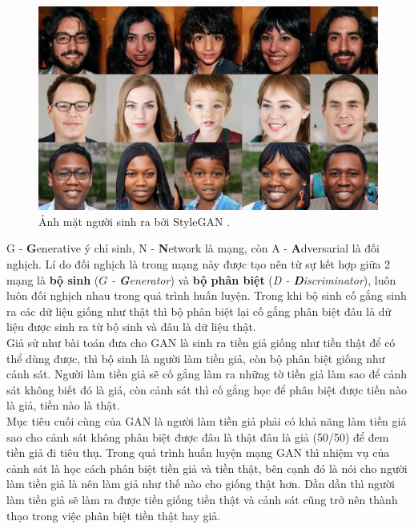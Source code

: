 \documentclass[a4paper, 12pt]{article}
\begin{document}
\begin{figure}[!h]
\captionsetup{width=0.8\textwidth}
\centering
\includegraphics[width=14cm]{images/2_6.PNG}
\caption{Ảnh mặt người sinh ra bởi StyleGAN \cite{karras2019stylebased}.}
\label{fig:facesstylegan}
\end{figure}

\noindent
G - \textbf{G}enerative ý chỉ sinh, N - \textbf{N}etwork là mạng, còn A - \textbf{A}dversarial là đối nghịch. Lí do đối nghịch là trong mạng này được tạo nên từ sự kết hợp giữa 2 mạng là \textbf{bộ sinh} ($G$ \textit{- \textbf{G}enerator}) và \textbf{bộ phân biệt} (\textit{D - \textbf{D}iscriminator}), luôn luôn đối nghịch nhau trong quá trình huấn luyện. Trong khi bộ sinh cố gắng sinh ra các dữ liệu giống như thật thì bộ phân biệt lại cố gắng phân biệt đâu là dữ liệu được sinh ra từ bộ sinh và đâu là dữ liệu thật.\vspace{5pt}\\
Giả sử như bài toán đưa cho GAN là sinh ra tiền giả giống như tiền thật để có thể dùng được, thì bộ sinh là người làm tiền giả, còn bộ phân biệt giống như cảnh sát. Người làm tiền giả sẽ cố gắng làm ra những tờ tiền giả làm sao để cảnh sát không biết đó là giả, còn cảnh sát thì cố gắng học để phân biệt được tiền nào là giả, tiền nào là thật.\vspace{5pt}\\
Mục tiêu cuối cùng của GAN là người làm tiền giả phải có khả năng làm tiền giả sao cho cảnh sát không phân biệt được đâu là thật đâu là giả (50/50) để đem tiền giả đi tiêu thụ. Trong quá trình huấn luyện mạng GAN thì nhiệm vụ của cảnh sát là học cách phân biệt tiền giả và tiền thật, bên cạnh đó là nói cho người làm tiền giả là nên làm giả như thế nào cho giống thật hơn. Dần dần thì người làm tiền giả sẽ làm ra được tiền giống tiền thật và cảnh sát cũng trở nên thành thạo trong việc phân biệt tiền thật hay giả.
\end{document}
